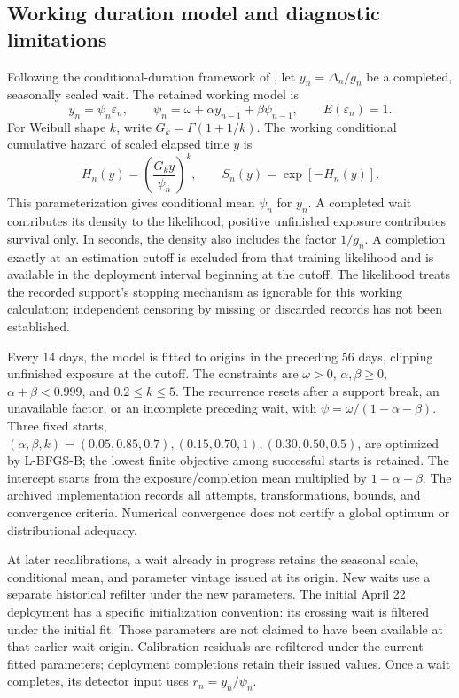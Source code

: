 \documentclass[12pt,letterpaper]{article}
\begin{document}
\subsection{Working duration model and diagnostic limitations}
Following the conditional-duration framework of \citet{engle1998duration}, let $y_n=\Delta_n/g_n$ be a completed, seasonally scaled wait. The retained working model is
\begin{equation}
 y_n=\psi_n\varepsilon_n,\qquad
 \psi_n=\omega+\alpha y_{n-1}+\beta\psi_{n-1},
 \qquad E(\varepsilon_n)=1.
 \label{eq:app-acd}
\end{equation}
For Weibull shape $k$, write $G_k=\Gamma(1+1/k)$. The working conditional cumulative hazard of scaled elapsed time $y$ is
\begin{equation}
 H_n(y)=\left(\frac{G_k y}{\psi_n}\right)^k,
 \qquad
 S_n(y)=\exp[-H_n(y)].
 \label{eq:app-acd-hazard}
\end{equation}
This parameterization gives conditional mean $\psi_n$ for $y_n$. A completed wait contributes its density to the likelihood; positive unfinished exposure contributes survival only. In seconds, the density also includes the factor $1/g_n$. A completion exactly at an estimation cutoff is excluded from that training likelihood and is available in the deployment interval beginning at the cutoff. The likelihood treats the recorded support's stopping mechanism as ignorable for this working calculation; independent censoring by missing or discarded records has not been established.

Every 14 days, the model is fitted to origins in the preceding 56 days, clipping unfinished exposure at the cutoff. The constraints are $\omega>0$, $\alpha,\beta\geq0$, $\alpha+\beta<0.999$, and $0.2\leq k\leq5$. The recurrence resets after a support break, an unavailable factor, or an incomplete preceding wait, with $\psi=\omega/(1-\alpha-\beta)$. Three fixed starts, $(\alpha,\beta,k)=(0.05,0.85,0.7),(0.15,0.70,1),(0.30,0.50,0.5)$, are optimized by L-BFGS-B; the lowest finite objective among successful starts is retained. The intercept starts from the exposure/completion mean multiplied by $1-\alpha-\beta$. The archived implementation records all attempts, transformations, bounds, and convergence criteria. Numerical convergence does not certify a global optimum or distributional adequacy.

At later recalibrations, a wait already in progress retains the seasonal scale, conditional mean, and parameter vintage issued at its origin. New waits use a separate historical refilter under the new parameters. The initial April 22 deployment has a specific initialization convention: its crossing wait is filtered under the initial fit. Those parameters are not claimed to have been available at that earlier wait origin. Calibration residuals are refiltered under the current fitted parameters; deployment completions retain their issued values. Once a wait completes, its detector input uses $r_n=y_n/\psi_n$.
\end{document}
